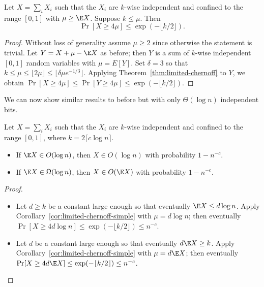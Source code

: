 \documentclass[11pt,a4paper]{article}
\begin{document}
\begin{tcolorbox}
  \begin{corollary}
    \label{cor:limited-chernoff-simple}
    Let \(X = \sum_i X_i\) such that the \(X_i\) are \(k\)-wise independent and confined to the range \([0, 1]\) with \(\mu \ge \E X\).
    Suppose \(k \le \mu.\)
    Then \[\Pr[X \ge 4\mu] \le \exp(-\lfloor k/2 \rfloor).\]
  \end{corollary}
\end{tcolorbox}
\begin{proof}
  Without loss of generality assume \(\mu \ge 2\) since otherwise the statement is trivial.
  Let \(Y = X + \mu - \E X\) as before; then \(Y\) is a sum of \(k\)-wise independent \([0, 1]\) random variables with \(\mu = E[Y]\).
  Set \(\delta = 3\) so that \(k \le \mu \le \lfloor 2\mu \rfloor \le \lfloor \delta \mu e^{-1/3} \rfloor\).
  Applying Theorem~\ref{thm:limited-chernoff} to \(Y\), we obtain
  \(\Pr[X \ge 4\mu] \le \Pr[Y \ge 4\mu] \le \exp(-\lfloor k/2 \rfloor).\)
\end{proof}

We can now show similar results to before but with only \(\Theta(\log n)\) independent bits.

\begin{tcolorbox}
  \begin{corollary}
    Let \(X = \sum_i X_i\) such that the \(X_i\) are \(k\)-wise independent and confined to the range \([0, 1]\), where \(k = 2\lceil c\log n \rceil\).
    \begin{itemize}
    \item If \(\E X \in O(\log n)\), then  \(X \in O(\log n)\) with probability \(1 - n^{-c}\).
    \item If \(\E X \in \Omega(\log n)\), then \(X \in O(\E X)\) with probability \(1 - n^{-c}\).
    \end{itemize}
  \end{corollary}
\end{tcolorbox}
\begin{proof}\hfill
  \begin{itemize}
  \item
    Let \(d \ge k\) be a constant large enough so that eventually \(\E X \le d \log n\).
    Apply Corollary~\ref{cor:limited-chernoff-simple} with \(\mu = d \log n\); 
    then eventually \(\Pr[X \ge 4d \log n] \le \exp(-\lfloor k/2 \rfloor) \le n^{-c}\).
  \item
    Let \(d\) be a constant large enough so that eventually \(d \E X \ge k\).
    Apply Corollary~\ref{cor:limited-chernoff-simple} with \(\mu = d\E X\);
    then eventually \(\Pr[X \ge 4d\E X] \le \exp(-\lfloor k/2 \rfloor) \le n^{-c}\).
  \end{itemize}
\end{proof}
\end{document}
